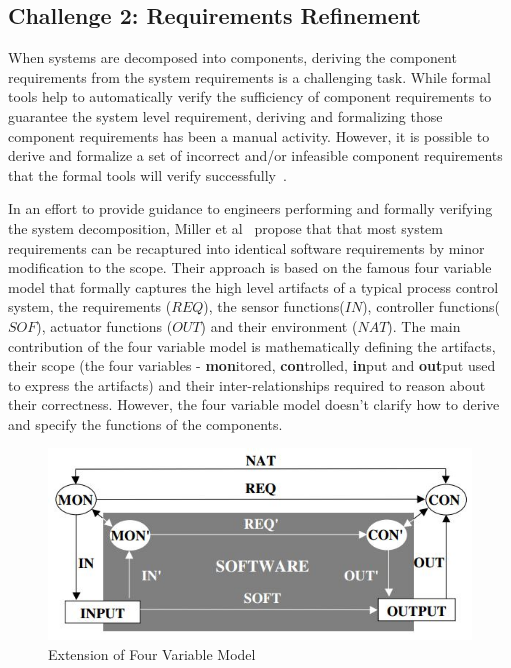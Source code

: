 \subsection{Challenge 2: Requirements Refinement}

When systems are decomposed into components, deriving the component requirements from the system requirements is a challenging task. While formal tools help to automatically verify the sufficiency of component requirements to guarantee the system level requirement, deriving and formalizing those component requirements has been a manual activity. However, it is possible to derive and formalize a set of incorrect and/or infeasible component requirements that the formal tools will verify successfully~\cite{gacek2015towards}.

In an effort to provide guidance to engineers performing and formally verifying the system decomposition, Miller et al~\cite{extending4varmodel} propose that that most system requirements can be recaptured into identical software requirements by minor modification to the scope. Their approach is based on the famous four variable model that formally captures the high level artifacts of a typical process control system, the requirements ($REQ$), the sensor functions($IN$), controller functions($SOF$), actuator functions ($OUT$) and their environment ($NAT$). The main contribution of the four variable model is mathematically defining the artifacts, their scope (the four variables - \textbf{mon}itored, \textbf{con}trolled, \textbf{in}put and \textbf{out}put used to express the artifacts) and their inter-relationships required to reason about their correctness. However, the four variable model doesn't clarify how to derive and specify the functions of the components.

\begin{figure}[h!]
    \centering
    \includegraphics[scale=0.6] {images/FourVarExtn.jpg}
    \caption{Extension of Four Variable Model}
    \label{fig:extn-four-var}
 \end{figure}

